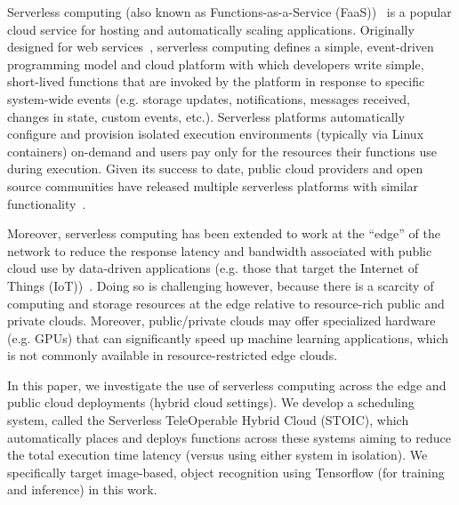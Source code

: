 Serverless computing (also known as Functions-as-a-Ser\-vice (FaaS))~\cite{ref:aws-lambda,ref:faas3,ref:afunctions-16} is a popular cloud service for hosting and automatically scaling applications. Originally designed for web services~\cite{ref:lambda-webservices,ref:lambda-microservices}, serverless computing defines a simple, event-driven programming model and cloud platform with which developers write simple, short-lived functions that are invoked by the platform in response to specific system-wide events (e.g. storage updates, notifications, messages received, changes in state, custom events, etc.). Serverless platforms automatically configure and provision isolated execution environments (typically via Linux containers) on-demand and users pay only for the resources their functions use during execution. Given its success to date, public cloud providers and open source communities have released multiple serverless platforms with similar functionality~\cite{ref:aws-lambda,ref:afunctions-16,ref:gfunctions-16,cspot19,ref:openwhisk-16,ref:ironio-16}.

Moreover, serverless computing has been extended to work at the ``edge'' of the network to reduce the response latency and bandwidth associated with public cloud use by data-driven applications (e.g.  those that target the Internet of Things (IoT))~\cite{ aws-greengrass, iothub-web, iotedge-web}. Doing so is challenging however, because there is a scarcity of computing and storage resources at the edge relative to resource-rich public and private clouds. Moreover, public/private clouds may offer specialized hardware (e.g. GPUs) that can significantly speed up machine learning applications, which is not commonly available in resource-restricted edge clouds.

In this paper, we investigate the use of serverless computing across the edge and public cloud deployments (hybrid cloud settings). We develop a scheduling system, called the Serverless TeleOperable Hybrid Cloud (STOIC), which automatically places and deploys functions across these systems aiming to reduce the total execution time latency (versus using either system in isolation). We specifically target image-based, object recognition using Tensorflow (for training and inference) in this work.

